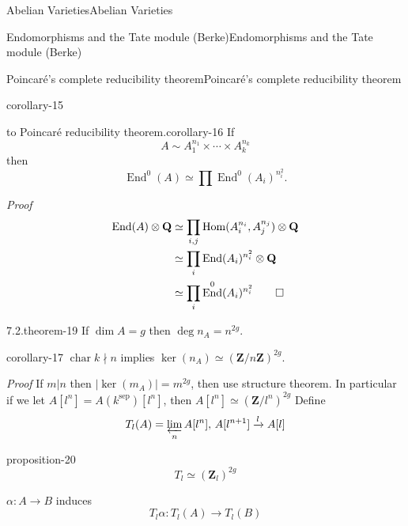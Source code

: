 \documentclass[10pt,]{book}
\makeatletter
\renewcommand*{\proofname}{Proof}
\renewenvironment{proof}[1][\proofname]{\par
  \pushQED{\qed}%
  \normalfont \topsep6\p@\@plus6\p@\relax
  \trivlist
  \item\relax
    {\itshape
    #1\@addpunct{.}}\hspace\labelsep\ignorespaces
}{%
  \popQED\endtrivlist\@endpefalse
}
\numberwithin{equation}{section}
\newcommand{\lb}{[}
\newcommand{\rb}{]}
\newcommand{\ZZ}{\mathbf{Z}}
\newcommand{\QQ}{\mathbf{Q}}
\newcommand{\sep}{\mathrm{sep}}
\DeclareMathOperator{\End}{End}
\DeclareMathOperator{\Hom}{Hom}
\DeclareMathOperator{\characteristic}{char}
\newcommand{\amp}{&}
\makeatother
\begin{document}
\begin{chapterptx}{Abelian Varieties}{}{Abelian Varieties}{}{}
\begin{sectionptx}{Endomorphisms and the Tate module (Berke)}{}{Endomorphisms and the Tate module (Berke)}{}{}
\begin{subsectionptx}{Poincaré's complete reducibility theorem}{}{Poincaré's complete reducibility theorem}{}{}
\begin{corollary}{}{}{corollary-15}
\end{corollary}
\begin{corollary}{to Poincaré reducibility theorem.}{}{corollary-16}%
\hypertarget{p-221}{}%
If%
\begin{equation*}
A\sim A_1^{n_1} \times \cdots \times A_k^{n_k}
\end{equation*}
then%
\begin{equation*}
\End^0(A) \simeq \prod \End^0(A_i)^{n_i^2}\text{.}
\end{equation*}
%
\end{corollary}
\begin{proof}\hypertarget{proof-41}{}
\hypertarget{p-222}{}%
%
\begin{align*}
\End(A) \otimes \QQ \amp \simeq \prod_{i,j} \Hom(A_i^{n_i}, A_j^{n_j}) \otimes \QQ\\
\amp \simeq \prod_{i} \End(A_i)^{n_i^2} \otimes \QQ\\
\amp \simeq \prod_{i} \End^0(A_i)^{n_i^2}\qedhere
\end{align*}
%
\end{proof}
\begin{theorem}{7.2.}{}{theorem-19}%
\hypertarget{p-223}{}%
If \(\dim A = g\) then \(\deg n_A  =n^{2g}\).%
\end{theorem}
\begin{corollary}{}{}{corollary-17}%
\hypertarget{p-224}{}%
\(\characteristic k \nmid n\) implies \(\ker(n_A) \simeq (\ZZ/n\ZZ)^{2g}\).%
\end{corollary}
\begin{proof}\hypertarget{proof-42}{}
\hypertarget{p-225}{}%
If  \(m | n\) then \(|\ker (m_A)| = m^{2g}\), then use structure theorem.%
\end{proof}
\hypertarget{p-226}{}%
In particular if we let \(A\lb l^n\rb = A(k^\sep) \lb l^n\rb\), then \(A\lb l^n\rb \simeq (\ZZ/l^n)^{2g}\) Define%
\begin{equation*}
T_l(A) = \varprojlim_n A[l^n],\, A[l^{n+1}] \xrightarrow{l} A[l]
\end{equation*}
%
\begin{proposition}{}{}{proposition-20}%
\hypertarget{p-227}{}%
%
\begin{equation*}
T_l \simeq (\ZZ_l)^{2g}
\end{equation*}
%
\end{proposition}
\hypertarget{p-228}{}%
\(\alpha \colon A \to B\) induces%
\begin{equation*}
T_l\alpha\colon T_l(A) \to T_l(B)
\end{equation*}

\end{subsectionptx}
\end{sectionptx}
\end{chapterptx}
\end{document}
